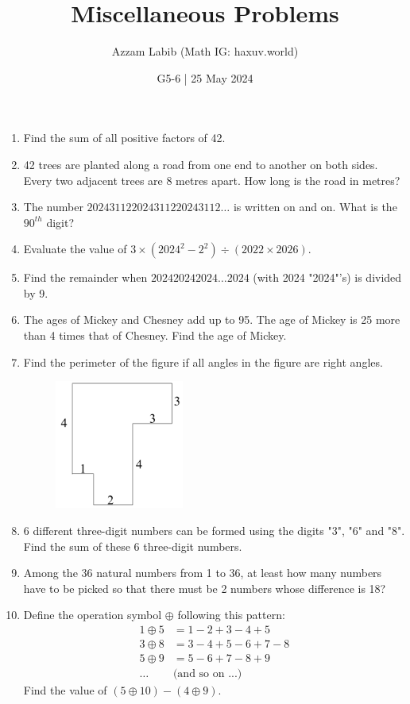 \documentclass[11pt]{scrartcl}
\begin{document}
\title{Miscellaneous Problems}
\author{Azzam Labib (Math IG: haxuv.world)}
\date{G5-6 | 25 May 2024}
\maketitle

\begin{enumerate}
    \item Find the sum of all positive factors of 42.
     \item 42 trees are planted along a road from one end to another on both sides. Every two adjacent trees are 8 metres apart. How long is the road in metres?
     \item The number $202431122024311220243112\ldots$ is written on and on. What is the $90^{th}$ digit?
     \item Evaluate the value of $3 \times (2024^2 - 2^2) \div (2022 \times 2026)$.
     \item Find the remainder when $202420242024\ldots2024$ (with 2024 "2024"'s) is divided by 9. 
     \item The ages of Mickey and Chesney add up to 95. The age of Mickey is 25 more than 4 times that of Chesney. Find the age of Mickey.
     \item Find the perimeter of the figure if all angles in the figure are right angles. 
    \begin{figure}[h]
        \centering
        \includegraphics[width=0.4\textwidth]{StarGen/0Figure/perim.png}
    \end{figure}
    \item 6 different three-digit numbers can be formed using the digits "3", "6" and "8". Find the sum of these 6 three-digit numbers.
    
    \item Among the 36 natural numbers from 1 to 36, at least how many numbers have to be picked so that there must be 2 numbers whose difference is 18?
    
     \item Define the operation symbol $\oplus$ following this pattern:
    \begin{align*}
    1 \oplus 5 &= 1 - 2 + 3 - 4 + 5\\
    3 \oplus 8 &= 3 - 4 + 5 - 6 + 7 - 8\\
    5 \oplus 9 &= 5 - 6 + 7 - 8 + 9\\
    \dots& \text{(and so on ...)}
    \end{align*}
    Find the value of $(5 \oplus 10) - (4 \oplus 9).$
    

\end{enumerate}
\end{document}
